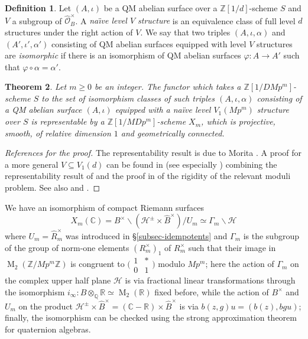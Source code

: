 \documentclass[a4paper,11pt]{amsart}
\numberwithin{equation}{section}
\theoremstyle{plain}
\newtheorem{theorem}{Theorem}[section]
\theoremstyle{definition}
\newtheorem{definition}[theorem]{Definition}
\theoremstyle{remark}
\newcommand{\Q}{\mathbb{Q}}
\newcommand{\Z}{\mathbb{Z}}
\newcommand{\R}{\mathbb{R}}
\newcommand{\C}{\mathbb{C}}
\DeclareMathOperator{\M}{M}
\newcommand{\smallmat}[4]{\bigl(\begin{smallmatrix}#1&#2\\#3&#4\end{smallmatrix}\bigr)}
\begin{document}
\begin{definition}
Let $(A,\iota)$ be a QM abelian surface  over a $\Z[1/d]$-scheme $S$ and $V$ a subgroup of $\widehat{\mathcal{O}}_B^\times$. A \emph{na\"{\i}ve level $V$ structure} is an equivalence class of full level $d$ structures under the right action of $V$. We say that two triples $(A,\iota,\alpha)$ and $(A',\iota',\alpha')$ consisting of QM abelian surfaces equipped with level $ V$ structures are \emph{isomorphic} if there is an isomorphism of QM abelian surfaces $\varphi\colon A\rightarrow A'$ such that $\varphi\circ\alpha=\alpha'$.  \end{definition}

\begin{theorem}
Let $m\geq 0$ be an integer. The functor which takes a {$\Z[1/DMp^m]$}-scheme $S$ to the set of isomorphism classes of such triples $(A,\iota,\alpha)$ consisting of a QM abelian surface $(A,\iota)$ equipped with a na\"ive level $V_1(Mp^m)$ structure over $S$ is representable by a {$\Z[1/MDp^m]$}-scheme ${X}_{m}$, which is projective, smooth, of relative dimension $1$ and geometrically connected.
\end{theorem}
\begin{proof}[References for the proof] 
The representability result is due to Morita \cite[Main Theorem 1]{Morita}. A proof for a more general $V\subseteq V_1(d)$ can be found in \cite[\S2]{Buz} (see especially \cite[Corollary 2.3 and Propositions 2.4 and 2.5]{Buz}) combining the representability result of \cite[Theorem \S14, Exposé III]{Boutot} and the proof in \cite[Lemma 2.2]{Buz} of the rigidity of the relevant moduli problem. See also \cite[\S4]{DT} and \cite[Theorem 2.2]{Brooks}. 
\end{proof}

We have an isomorphism of compact Riemann surfaces 
\[X_m(\C)= B^\times\backslash(\mathcal{H}^\pm\times\widehat{B}^\times)/U_m\simeq \Gamma_m\backslash\mathcal{H}\]
where $U_m=\widehat{R}_m^\times$ was introduced in \S\ref{subsec-idempotents} and 
$\Gamma_m$ is the subgroup of the group of norm-one elements $(R_m^\times)_1$ of $R_m^\times$ such that their image in $\M_2(\Z/Mp^m\Z)$ is congruent to $\smallmat 1*01$ modulo $Mp^m$; here the action of $\Gamma_m$ on the complex upper half plane $\mathcal{H}$ is via fractional linear transformations through the isomorphism $i_\infty\colon B\otimes_\Q\R\simeq\M_2(\R)$ fixed before, while the action of $B^\times$ and $U_m$ on the product $\mathcal{H}^\pm\times\widehat{B}^\times=(\C-\R)\times\widehat{B}^\times$ is via $b(z,g)u=(b(z),bgu)$; finally, the isomorphism can be checked using the strong approximation theorem \cite[Theorem 5.2.10]{Miyake} for quaternion algebras. 
\end{document}
